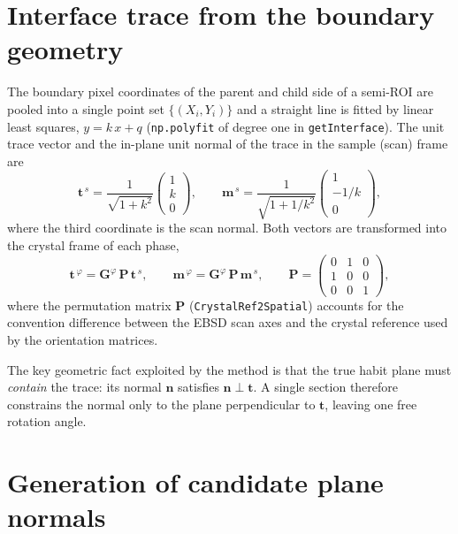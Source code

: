 \documentclass[11pt,a4paper]{article}
\newcommand{\mat}[1]{\mathbf{#1}}
\newcommand{\vc}[1]{\bm{#1}}
\begin{document}
\section{Interface trace from the boundary geometry}

The boundary pixel coordinates of the parent and child side of a semi-ROI are pooled into a single point set $\{(X_i,Y_i)\}$ and a straight line is fitted by linear least squares, $y = k\,x + q$ (\texttt{np.polyfit} of degree one in \texttt{getInterface}). The unit trace vector and the in-plane unit normal of the trace in the sample (scan) frame are
\begin{equation}
\vc t^{\,s}=\frac{1}{\sqrt{1+k^{2}}}\begin{pmatrix}1\\ k\\ 0\end{pmatrix},
\qquad
\vc m^{\,s}=\frac{1}{\sqrt{1+1/k^{2}}}\begin{pmatrix}1\\ -1/k\\ 0\end{pmatrix},
\label{eq:trace}
\end{equation}
where the third coordinate is the scan normal. Both vectors are transformed into the crystal frame of each phase,
\begin{equation}
\vc t^{\,\varphi}=\mat{G}^{\varphi}\,\mat P\,\vc t^{\,s},
\qquad
\vc m^{\,\varphi}=\mat{G}^{\varphi}\,\mat P\,\vc m^{\,s},
\qquad
\mat P=\begin{pmatrix}0&1&0\\ 1&0&0\\ 0&0&1\end{pmatrix},
\label{eq:crystal_trace}
\end{equation}
where the permutation matrix $\mat P$ (\texttt{CrystalRef2Spatial}) accounts for the convention difference between the EBSD scan axes and the crystal reference used by the orientation matrices.

The key geometric fact exploited by the method is that the true habit plane must \emph{contain} the trace: its normal $\vc n$ satisfies $\vc n\perp\vc t$. A single section therefore constrains the normal only to the plane perpendicular to $\vc t$, leaving one free rotation angle.

\section{Generation of candidate plane normals}
\end{document}
